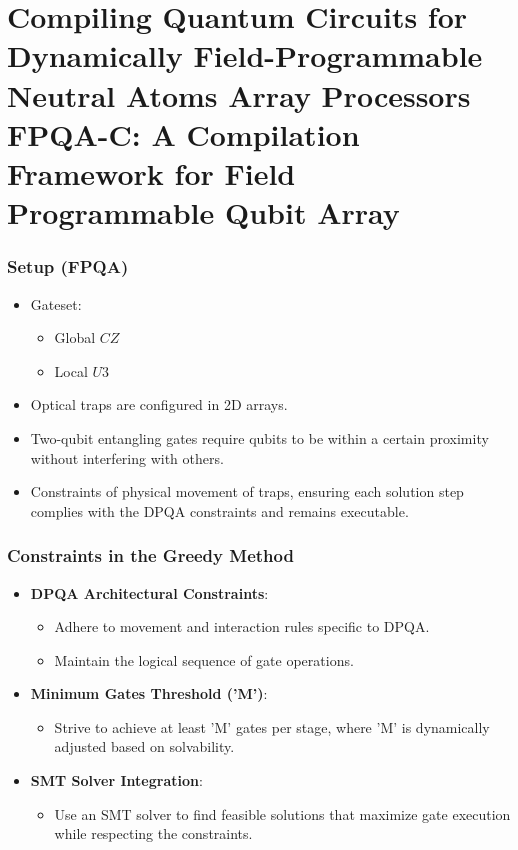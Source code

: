 \documentclass[18 pt]{beamer}
\begin{document}
\section{Compiling Quantum Circuits for Dynamically Field-Programmable Neutral Atoms Array Processors\\FPQA-C: A Compilation Framework for Field Programmable Qubit Array}
\begin{frame}
    \frametitle{Setup (FPQA)}
    \begin{itemize}
        \item Gateset:
        \begin{itemize}
            \item Global $CZ$
            \item Local $U3$
        \end{itemize}
        \item Optical traps are configured in 2D arrays.
        \item Two-qubit entangling gates require qubits to be within a certain proximity without interfering with others.
        \item Constraints of physical movement of traps, ensuring each solution step complies with the DPQA constraints and remains executable.
    \end{itemize}
\end{frame}

\begin{frame}
    \frametitle{Constraints in the Greedy Method}
    \begin{itemize}
        \item \textbf{DPQA Architectural Constraints}:
        \begin{itemize}
            \item Adhere to movement and interaction rules specific to DPQA.
            \item Maintain the logical sequence of gate operations.
        \end{itemize}
        \item \textbf{Minimum Gates Threshold ('M')}:
        \begin{itemize}
            \item Strive to achieve at least 'M' gates per stage, where 'M' is dynamically adjusted based on solvability.
        \end{itemize}
        \item \textbf{SMT Solver Integration}:
        \begin{itemize}
            \item Use an SMT solver to find feasible solutions that maximize gate execution while respecting the constraints.
        \end{itemize}
    \end{itemize}
\end{frame}
\end{document}
